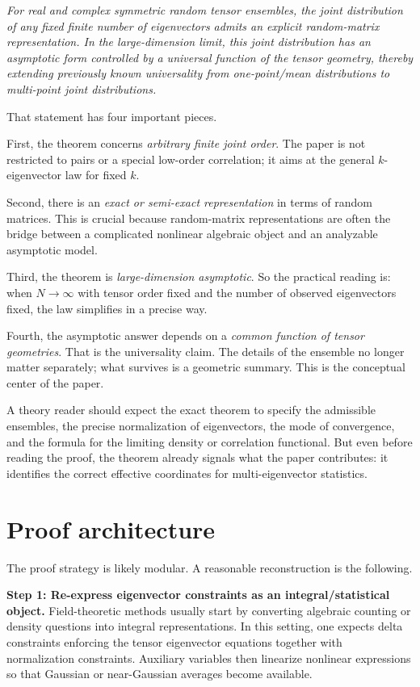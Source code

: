 \documentclass[11pt]{article}
\begin{document}
\emph{For real and complex symmetric random tensor ensembles, the joint distribution of any fixed finite number of eigenvectors admits an explicit random-matrix representation. In the large-dimension limit, this joint distribution has an asymptotic form controlled by a universal function of the tensor geometry, thereby extending previously known universality from one-point/mean distributions to multi-point joint distributions.}

That statement has four important pieces.

First, the theorem concerns \emph{arbitrary finite joint order}. The paper is not restricted to pairs or a special low-order correlation; it aims at the general $k$-eigenvector law for fixed $k$.

Second, there is an \emph{exact or semi-exact representation} in terms of random matrices. This is crucial because random-matrix representations are often the bridge between a complicated nonlinear algebraic object and an analyzable asymptotic model.

Third, the theorem is \emph{large-dimension asymptotic}. So the practical reading is: when $N\to\infty$ with tensor order fixed and the number of observed eigenvectors fixed, the law simplifies in a precise way.

Fourth, the asymptotic answer depends on a \emph{common function of tensor geometries}. That is the universality claim. The details of the ensemble no longer matter separately; what survives is a geometric summary. This is the conceptual center of the paper.

A theory reader should expect the exact theorem to specify the admissible ensembles, the precise normalization of eigenvectors, the mode of convergence, and the formula for the limiting density or correlation functional. But even before reading the proof, the theorem already signals what the paper contributes: it identifies the correct effective coordinates for multi-eigenvector statistics.

\section*{Proof architecture}
The proof strategy is likely modular. A reasonable reconstruction is the following.

\textbf{Step 1: Re-express eigenvector constraints as an integral/statistical object.}
Field-theoretic methods usually start by converting algebraic counting or density questions into integral representations. In this setting, one expects delta constraints enforcing the tensor eigenvector equations together with normalization constraints. Auxiliary variables then linearize nonlinear expressions so that Gaussian or near-Gaussian averages become available.
\end{document}
